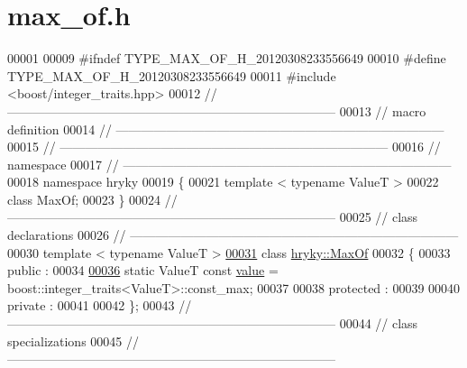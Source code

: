 \hypertarget{max__of_8h_source}{\section{max\-\_\-of.\-h}
}

\begin{DoxyCode}
00001 
00009 \textcolor{preprocessor}{#ifndef TYPE\_MAX\_OF\_H\_20120308233556649}
00010 \textcolor{preprocessor}{}\textcolor{preprocessor}{#define TYPE\_MAX\_OF\_H\_20120308233556649}
00011 \textcolor{preprocessor}{}\textcolor{preprocessor}{#include <boost/integer\_traits.hpp>}
00012 \textcolor{comment}{//
      ------------------------------------------------------------------------------}
00013 \textcolor{comment}{// macro definition}
00014 \textcolor{comment}{//
      ------------------------------------------------------------------------------}
00015 \textcolor{comment}{//
      ------------------------------------------------------------------------------}
00016 \textcolor{comment}{// namespace}
00017 \textcolor{comment}{//
      ------------------------------------------------------------------------------}
00018 \textcolor{keyword}{namespace }hryky
00019 \{
00021     \textcolor{keyword}{template} < \textcolor{keyword}{typename} ValueT >
00022     \textcolor{keyword}{class }MaxOf;
00023 \}
00024 \textcolor{comment}{//
      ------------------------------------------------------------------------------}
00025 \textcolor{comment}{// class declarations}
00026 \textcolor{comment}{//
      ------------------------------------------------------------------------------}
00030 \textcolor{comment}{}\textcolor{keyword}{template} < \textcolor{keyword}{typename} ValueT >
\hypertarget{max__of_8h_source_l00031}{}\hyperlink{classhryky_1_1_max_of}{00031} \textcolor{keyword}{class }\hyperlink{classhryky_1_1_max_of}{hryky::MaxOf}
00032 \{
00033 \textcolor{keyword}{public} :
00034 
\hypertarget{max__of_8h_source_l00036}{}\hyperlink{classhryky_1_1_max_of_ac1b33ef8eabaa778015f524edd8b9b1d}{00036}     \textcolor{keyword}{static} ValueT \textcolor{keyword}{const} \hyperlink{classhryky_1_1_max_of_ac1b33ef8eabaa778015f524edd8b9b1d}{value} = boost::integer\_traits<ValueT>::const\_max;
00037 
00038 \textcolor{keyword}{protected} :
00039 
00040 \textcolor{keyword}{private} :
00041 
00042 \};
00043 \textcolor{comment}{//
      ------------------------------------------------------------------------------}
00044 \textcolor{comment}{// class specializations}
00045 \textcolor{comment}{//
      ------------------------------------------------------------------------------}

\end{DoxyCode}
